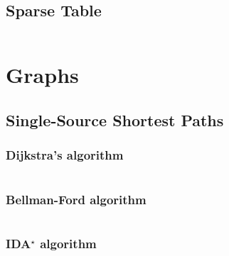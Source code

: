 \documentclass[8pt,a4paper,landscape,oneside]{amsart}
\newcommand{\code}[1]{\inputminted[fontsize=\normalsize,baselinestretch=1]{cpp}{_code/#1}}
\newif\ifverbose
\begin{document}
\begin{multicols*}{3}
    \subsection{Sparse Table}
        \code{data-structures/sparse_table.cpp}

\section{Graphs}
    \subsection{Single-Source Shortest Paths}
        \subsubsection{Dijkstra's algorithm}
            \ifverbose
            An implementation of Dijkstra's algorithm. It runs in
            $\Theta(|E|\log{|V|})$ time.
            \fi
            \code{graph/dijkstra.cpp}

        \subsubsection{Bellman-Ford algorithm}
            \ifverbose
            The Bellman-Ford algorithm solves the single-source shortest paths
            problem in $O(|V||E|)$ time. It is slower than Dijkstra's
            algorithm, but it works on graphs with negative edges and has the
            ability to detect negative cycles, neither of which Dijkstra's
            algorithm can do.
            \fi
            \code{graph/bellman_ford.cpp}

        \subsubsection{IDA$^\star$ algorithm}
            \code{graph/idastar.cpp}

    \ifverbose
    \subsection{All-Pairs Shortest Paths}
        \subsubsection{Floyd-Warshall algorithm}
            The Floyd-Warshall algorithm solves the all-pairs shortest paths
            problem in $O(|V|^3)$ time.
            \code{graph/floyd_warshall.cpp}
    \fi


\end{multicols*}
\end{document}
